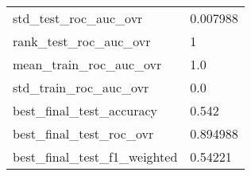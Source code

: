 \begin{tabular}{ll}
std\_test\_roc\_auc\_ovr        &                                           0.007988 \\
rank\_test\_roc\_auc\_ovr       &                                                  1 \\
mean\_train\_roc\_auc\_ovr      &                                                1.0 \\
std\_train\_roc\_auc\_ovr       &                                                0.0 \\
best\_final\_test\_accuracy    &                                              0.542 \\
best\_final\_test\_roc\_ovr     &                                           0.894988 \\
best\_final\_test\_f1\_weighted &                                            0.54221 \\
\bottomrule
\end{tabular}
